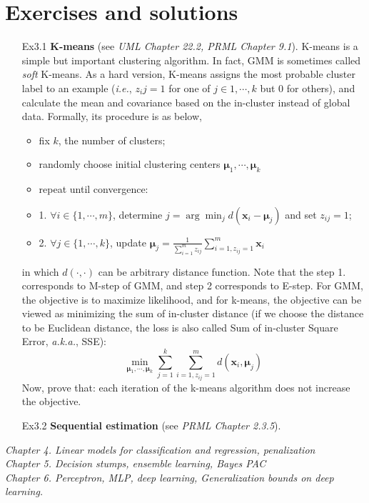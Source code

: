 \documentclass{article}
\begin{document}
\section{Exercises and solutions}
\begin{itemize}
\item[Ex3.1] \textbf{K-means} (see \textit{UML Chapter 22.2, PRML Chapter 9.1}). K-means is a simple but important clustering algorithm. In fact, GMM is sometimes called \textit{soft} K-means. As a hard version, K-means assigns the most probable cluster label to an example (\textit{i.e.}, $z_ij=1$ for one of $j\in{1,\cdots,k}$ but 0 for others), and calculate the mean and covariance based on the in-cluster instead of global data. Formally, its procedure is as below,

	\begin{shaded}
    \begin{itemize}
	\item fix $k$, the number of clusters;
	\item randomly choose initial clustering centers $\bm{\mu}_1,\cdots,\bm{\mu}_k$
	\item repeat until convergence:
	\item 1. $\forall i\in \{1,\cdots,m\}$, determine $j=\arg\min_{j} d(\bm{x}_i-\bm{\mu}_j)$ and set $z_{ij}=1$;
	\item 2. $\forall j\in \{1,\cdots,k\}$, update $\bm{\mu}_j = \frac{1}{\sum_{i=1}^m z_{ij}} \sum_{i=1,z_{ij}=1}^m \bm{x}_i$
	\end{itemize}
  	\end{shaded}
in which $d(\cdot,\cdot)$ can be arbitrary distance function. Note that the step 1. corresponds to M-step of GMM, and step 2 corresponds to E-step. For GMM, the objective is to maximize likelihood, and for k-means, the objective can be viewed as minimizing the sum of in-cluster distance (if we choose the distance to be Euclidean distance, the loss is also called Sum of in-cluster Square Error, \textit{a.k.a.}, SSE):
	\begin{equation*}
	\min_{\bm{\mu}_1,\cdots,\bm{\mu}_k} \sum_{j=1}^k \sum_{i=1, z_{ij}=1}^m d(\bm{x}_i, \bm{\mu}_j)
	\end{equation*}
Now, prove that: each iteration of the k-means algorithm does not increase the objective.

\item[Ex3.2] \textbf{Sequential estimation} (see \textit{PRML Chapter 2.3.5}).

\end{itemize}
\textit{
	Chapter 4. Linear models for classification and regression, penalization \\
	  Chapter 5. Decision stumps, ensemble learning, Bayes PAC \\
      Chapter 6. Perceptron, MLP, deep learning, Generalization bounds on deep learning.}
\end{document}
